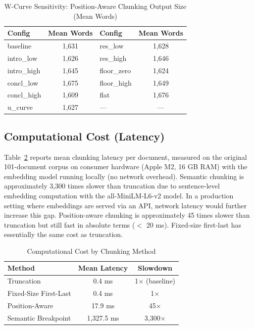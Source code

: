 \documentclass{ieeeaccess}
\begin{document}
\begin{table}[h]
\caption{W-Curve Sensitivity: Position-Aware Chunking Output Size (Mean Words)}
\label{tab:sensitivity}
\centering
\footnotesize
\begin{tabular}{|l|c||l|c|}
\hline
\textbf{Config} & \textbf{Mean Words} & \textbf{Config} & \textbf{Mean Words} \\
\hline
baseline & 1,631 & res\_low & 1,628 \\
intro\_low & 1,626 & res\_high & 1,646 \\
intro\_high & 1,645 & floor\_zero & 1,624 \\
concl\_low & 1,675 & floor\_high & 1,649 \\
concl\_high & 1,609 & flat & 1,676 \\
u\_curve & 1,627 & --- & --- \\
\hline
\end{tabular}
\end{table}

\subsection{Computational Cost (Latency)}
\label{sec:latency}

Table~\ref{tab:computational} reports mean chunking latency per document, measured on the original 101-document corpus on consumer hardware (Apple M2, 16 GB RAM) with the embedding model running locally (no network overhead). Semantic chunking is approximately 3,300 times slower than truncation due to sentence-level embedding computation with the all-MiniLM-L6-v2 model. In a production setting where embeddings are served via an API, network latency would further increase this gap. Position-aware chunking is approximately 45 times slower than truncation but still fast in absolute terms ($<$ 20 ms). Fixed-size first-last has essentially the same cost as truncation.

\begin{table}[h]
\caption{Computational Cost by Chunking Method}
\label{tab:computational}
\centering
\begin{tabular}{|l|c|c|}
\hline
\textbf{Method} & \textbf{Mean Latency} & \textbf{Slowdown} \\
\hline
Truncation & 0.4 ms & 1$\times$ (baseline) \\
Fixed-Size First-Last & 0.4 ms & 1$\times$ \\
Position-Aware & 17.9 ms & 45$\times$ \\
Semantic Breakpoint & 1,327.5 ms & 3,300$\times$ \\
\hline
\end{tabular}
\end{table}
\end{document}
